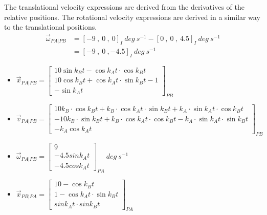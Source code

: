 \begin{description}
\begin{enumerate}
  The translational velocity expressions are derived from the derivatives of the relative positions.
  The rotational velocity expressions are derived in a similar way to the translational positions.
  \begin{equation*}
  \begin{split}
  \vec \omega_{PA|PB} &= [-9\ ,\ 0\    ,\ 0]_{I} \ deg\ s^{-1}- 
                      [0\  ,\ 0\    ,\ 4.5]_{I}\ deg\ s^{-1} \\
                    &=[-9\ ,\ 0\    , -4.5]_{I}\ deg\ s^{-1}
  \end{split}
 \end{equation*}
  \begin{itemize}
    \item $\vec x_{PA|PB} = \begin{bmatrix} 10 \sin k_B t - \cos k_A t \cdot \cos k_B t \\
                                          10 \cos k_B t + \cos k_A t \cdot \sin k_B t - 1 \\ 
                                          -\sin k_A t
                          \end{bmatrix}
                          _{PB}$
 
    \item $\vec v_{PA|PB} = \begin{bmatrix} 
           10 k_B \cdot \cos k_B t + k_B \cdot \cos k_A t \cdot \sin k_B t + k_A \cdot \sin k_A t \cdot \cos k_B t\\
          -10 k_B \cdot \sin k_B t + k_B \cdot \cos k_A t \cdot \cos k_B t - k_A \cdot \sin k_A t \cdot \sin k_B t\\ 
            - k_A \cos k_A t
           \end{bmatrix}_{PB}$
    
    \item $\vec \omega_{PA|PB} = \begin{bmatrix} 9\\
                                               -4.5 sin k_A t\\
                                               -4.5 cos k_A t
                               \end{bmatrix}_{PA}\ deg\ s^{-1}$
    
    \item $\vec x_{PB|PA} = \begin{bmatrix} 10 - \cos k_B t\\
                                          1 - \cos k_A t \cdot \sin k_B t\\
                                          sin k_A t \cdot sin k_B t
                          \end{bmatrix}_{PA}$


\end{itemize}
\end{enumerate}
\end{description}
